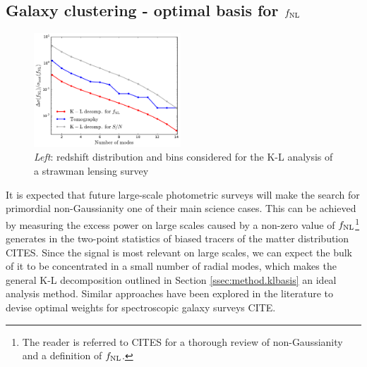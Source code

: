 \documentclass[twocolumn,amsfont,amssymb,amsmath, showpacs,balancelastpage, nofootinbib]{revtex4-1}
\begin{document}
  \subsection{Galaxy clustering - optimal basis for $f_{\rm NL}$}\label{ssec:results.fnl}
    \begin{figure}
      \centering
      \includegraphics[width=0.49\textwidth]{Figs/kl_fnl}
      \caption{{\sl Left}: redshift distribution and bins considered for the K-L analysis of a strawman lensing survey}\label{fig:kl_fnl}
    \end{figure}
    It is expected that future large-scale photometric surveys will make the search for primordial non-Gaussianity one of their main science cases. This can be achieved by measuring the excess power on large scales caused by a non-zero value of $f_{\rm NL}$\footnote{The reader is referred to CITES for a thorough review of non-Gaussianity and a definition of $f_{\rm NL}$.} generates in the two-point statistics of biased tracers of the matter distribution CITES. Since the signal is most relevant on large scales, we can expect the bulk of it to be concentrated in a small number of radial modes, which makes the general K-L decomposition outlined in Section \ref{ssec:method.klbasis} an ideal analysis method. Similar approaches have been explored in the literature to devise optimal weights for spectroscopic galaxy surveys CITE.
    
\end{document}
